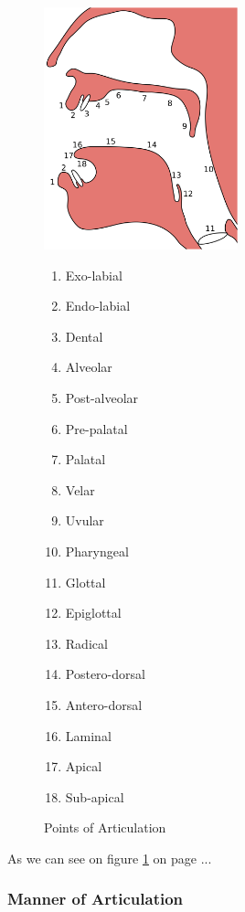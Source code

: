 \documentclass[12pt]{book}
\begin{document}
\begin{figure}[h]
	\caption{Points of Articulation}
	\centering
		\includegraphics[width=0.5\textwidth]{Places_of_articulation}
		\begin{multicols}{3}
			\begin{enumerate}
				\item Exo-labial
				\item Endo-labial
				\item Dental
				\item Alveolar
				\item Post-alveolar
				\item Pre-palatal
				\item Palatal
				\item Velar
				\item Uvular
				\item Pharyngeal
				\item Glottal
				\item Epiglottal
				\item Radical
				\item Postero-dorsal
				\item Antero-dorsal
				\item Laminal
				\item Apical
				\item Sub-apical
			\end{enumerate}
		\end{multicols}
	\label{figure:PointsOfArticulation}
\end{figure}


As we can see on figure \ref{figure:PointsOfArticulation} on page \pageref{figure:PointsOfArticulation} ...

\subsubsection{Manner of Articulation}
\end{document}
